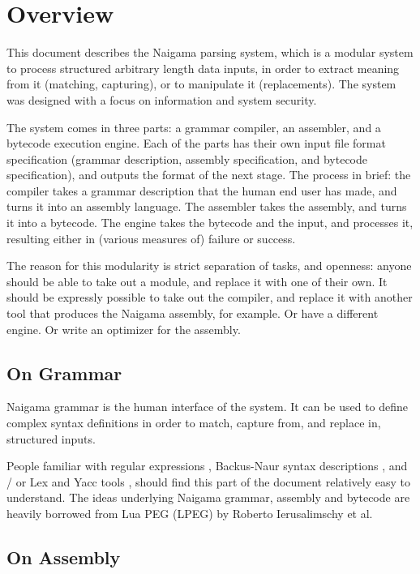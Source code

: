 \section{Overview}

This document describes the Naigama parsing system, which is a 
modular system to process structured arbitrary length data inputs,
in order to extract meaning from it (matching, capturing), or to
manipulate it (replacements).
The system was designed with a focus on information and system security.

The system comes in three parts: a grammar compiler, an assembler,
and a bytecode execution engine. Each of the parts has their own
input file format specification (grammar description, assembly specification,
and bytecode specification), and outputs the format of the next stage.
The process in brief: the compiler takes a
grammar description that the human end user has made, and turns it into
an assembly language. The assembler takes the assembly, and turns it
into a bytecode. The engine takes the bytecode and the input, and
processes it, resulting either in (various measures of) failure or
success.

The reason for this modularity is strict separation of tasks, and openness:
anyone should be able to take out a module, and replace it with one
of their own.
It should be expressly possible to take out the compiler, and replace
it with another tool that produces the Naigama assembly, for example.
Or have a different engine. Or write an optimizer for the assembly.

\subsection{On Grammar}
  
Naigama grammar is the human interface of the system.
It can be used to define complex syntax definitions in order
to match, capture from, and replace in, structured inputs.

People familiar with regular expressions \cite{bib:regex},
Backus-Naur syntax descriptions \cite{bib:backusnaur},
and / or Lex and Yacc tools \cite{bib:yacc},
should find this part of the document relatively easy to understand.
The ideas underlying Naigama grammar, assembly and bytecode
are heavily borrowed from Lua PEG (LPEG) \cite{bib:peg}
by Roberto Ierusalimschy et al.

\subsection{On Assembly}

